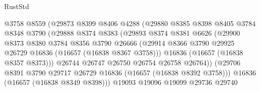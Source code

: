\begin{lexlean}{RustStd}
\begin{coremodule}
                                @3758
                                @8559
                                (@29873
                                  @8399
                                  @8406
                                  @4288
                                  (@29880
                                    @8385
                                    @8398
                                    @8405
                                    @3784
                                    @8348
                                    @3790
                                    (@29888
                                      @8374
                                      @8383
                                      (@29893
                                        @8374
                                        @8381
                                        @6626
                                        (@29900
                                          @8373
                                          @8380
                                          @3784
                                          @8356
                                          @3790
                                          @26666
                                          (@29914
                                            @8366
                                            @3790
                                            @29925
                                            @26729
                                            @16836
                                            (@16657 (@16838 @8367 @3758)))
                                          @16836
                                          (@16657 (@16838 @8357 @8373)))
                                        @26744
                                        @26747
                                        @26750
                                        @26754
                                        @26758
                                        @26764))
                                    (@29706
                                      @8391
                                      @3790
                                      @29717
                                      @26729
                                      @16836
                                      (@16657 (@16838 @8392 @3758)))
                                    @16836
                                    (@16657 (@16838 @8349 @8398)))
                                  @19093
                                  @19096
                                  @19099
                                  @29736
                                  @29740

\end{coremodule}
\end{lexlean}
